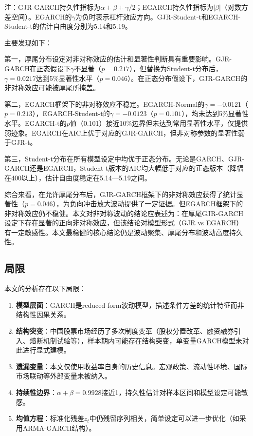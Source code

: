 \documentclass[11pt,a4paper]{article}
\begin{document}
注：GJR-GARCH持久性指标为\(\alpha+\beta+\gamma/2\)；EGARCH持久性指标为\(|\beta|\)（对数方差空间）。EGARCH的\(\gamma\)为负时表示杠杆效应方向。GJR-Student-t和EGARCH-Student-t的估计自由度分别为5.14和5.19。

主要发现如下：

第一，厚尾分布设定对非对称效应的估计和显著性判断具有重要影响。GJR-GARCH在正态假设下\(\gamma\)不显著（\(p=0.217\)），但替换为Student-t分布后，\(\gamma=0.0217\)达到5\%显著性水平（\(p=0.046\)）。在正态分布假设下，GJR-GARCH的非对称效应可能被厚尾所掩盖。

第二，EGARCH框架下的非对称效应不稳定。EGARCH-Normal的\(\gamma=-0.0121\)（\(p=0.213\)），EGARCH-Student-t的\(\gamma=-0.0123\)（\(p=0.101\)），均未达到5\%显著性水平。EGARCH-t的\(p\)值（0.101）接近10\%边界但未达到常用显著性水平，仅提供弱迹象。EGARCH在AIC上优于对应的GJR-GARCH，但非对称参数的显著性弱于GJR-t。

第三，Student-t分布在所有模型设定中均优于正态分布。无论是GARCH、GJR-GARCH还是EGARCH，Student-t版本的AIC均大幅低于对应的正态版本（降幅在400以上），估计自由度稳定在5.14—5.19之间。

综合来看，在允许厚尾分布后，GJR-GARCH框架下的非对称效应获得了统计显著性（\(p=0.046\)），为负向冲击放大波动提供了一定证据。但EGARCH框架下的非对称效应仍不稳健。本文对非对称波动的结论应表述为：在厚尾GJR-GARCH设定下存在显著的正向非对称效应，但该结论对模型形式（GJR vs EGARCH）有一定敏感性。本文最稳健的核心结论仍是波动聚集、厚尾分布和波动高度持久性。

\subsection{局限}

本文的分析存在以下局限：

\begin{enumerate}[nosep]
\item \textbf{模型层面}：GARCH是reduced-form波动模型，描述条件方差的统计特征而非结构性因果关系。
\item \textbf{结构突变}：中国股票市场经历了多次制度变革（股权分置改革、融资融券引入、熔断机制试验等），样本期内可能存在结构突变，单变量GARCH模型未对此进行显式建模。
\item \textbf{遗漏变量}：本文仅使用收益率自身的历史信息。宏观政策、流动性环境、国际市场联动等外部变量未被纳入。
\item \textbf{持续性边界}：\(\alpha+\beta=0.9928\)接近1，持久性估计对样本区间和模型设定可能敏感。
\item \textbf{均值方程}：标准化残差\(z_t\)中仍残留序列相关，简单设定可以进一步优化（如采用ARMA-GARCH结构）。
\end{enumerate}
\end{document}

